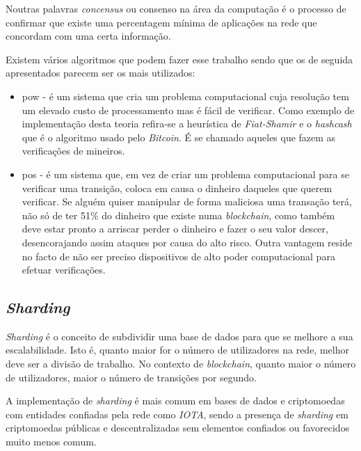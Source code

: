 Noutras palavras \textit{concensus} ou consenso na área da computação é o processo de confirmar que existe uma percentagem mínima de aplicações na rede que concordam com uma certa informação.

Existem vários algoritmos que podem fazer esse trabalho sendo que os de seguida apresentados parecem ser os mais utilizados:

\begin{itemize}
  \item
  \gls{pow} - é um sistema que cria um problema computacional
  cuja resolução tem um elevado custo de processamento mas é fácil de verificar. Como exemplo de implementação desta teoria refira-se a heurística de \textit{Fiat-Shamir} \cite{fiat-shamir_heuristic_wiki} 
  e o \textit{hashcash} que é o algoritmo usado pelo \textit{Bitcoin}. \cite{hashcash_wiki} É se chamado aqueles que fazem as verificações de mineiros. \cite{miners}

\item
  \gls{pos} - é um sistema que, em vez de criar um problema
  computacional para se verificar uma transição, coloca em causa o
  dinheiro daqueles que querem verificar. Se alguém quiser manipular de
  forma maliciosa uma transação terá, não só de ter 51\% do dinheiro que
  existe numa \textit{blockchain}, como também deve estar pronto a arriscar perder
  o dinheiro e fazer o seu valor descer, desencorajando assim ataques por causa do alto risco.
  Outra vantagem reside no facto de não ser preciso dispositivos de alto poder computacional para efetuar verificações. \cite{proof-of-stake}
  
\end{itemize}

\subsection{\textit{Sharding}}
\label{sharding}
\textit{Sharding} é o conceito de subdividir uma base de dados para que se melhore a sua escalabilidade. Isto é, quanto maior for o número de utilizadores na rede, melhor deve ser a divisão de trabalho. No contexto de \textit{blockchain}, quanto maior o número de utilizadores, maior o número de transições por segundo. \cite{sharding_geeks}

A implementação de \textit{sharding} é mais comum em bases de dados e criptomoedas com entidades confiadas pela rede como \textit{IOTA}, sendo a presença de \textit{sharding}  em criptomoedas públicas e descentralizadas sem elementos confiados ou favorecidos muito menos comum.

